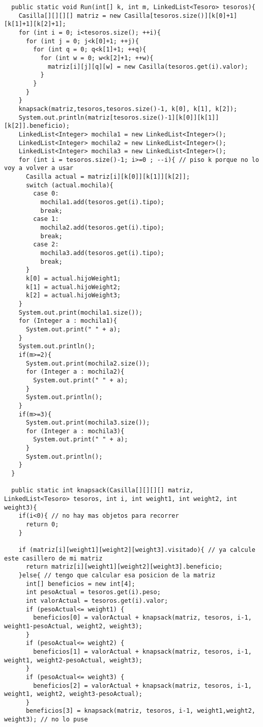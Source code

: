 \begin{lstlisting}
  public static void Run(int[] k, int m, LinkedList<Tesoro> tesoros){
    Casilla[][][][] matriz = new Casilla[tesoros.size()][k[0]+1][k[1]+1][k[2]+1];
    for (int i = 0; i<tesoros.size(); ++i){
      for (int j = 0; j<k[0]+1; ++j){
        for (int q = 0; q<k[1]+1; ++q){
          for (int w = 0; w<k[2]+1; ++w){
            matriz[i][j][q][w] = new Casilla(tesoros.get(i).valor);
          }
        }
      }
    }
    knapsack(matriz,tesoros,tesoros.size()-1, k[0], k[1], k[2]);
    System.out.println(matriz[tesoros.size()-1][k[0]][k[1]][k[2]].beneficio);
    LinkedList<Integer> mochila1 = new LinkedList<Integer>();
    LinkedList<Integer> mochila2 = new LinkedList<Integer>();
    LinkedList<Integer> mochila3 = new LinkedList<Integer>();
    for (int i = tesoros.size()-1; i>=0 ; --i){ // piso k porque no lo voy a volver a usar
      Casilla actual = matriz[i][k[0]][k[1]][k[2]];
      switch (actual.mochila){
        case 0:
          mochila1.add(tesoros.get(i).tipo);
          break;
        case 1:
          mochila2.add(tesoros.get(i).tipo);
          break;
        case 2:
          mochila3.add(tesoros.get(i).tipo);
          break;
      }
      k[0] = actual.hijoWeight1;
      k[1] = actual.hijoWeight2;
      k[2] = actual.hijoWeight3;
    }
    System.out.print(mochila1.size());
    for (Integer a : mochila1){
      System.out.print(" " + a);
    }
    System.out.println();
    if(m>=2){
      System.out.print(mochila2.size());
      for (Integer a : mochila2){
        System.out.print(" " + a);
      }
      System.out.println();
    }
    if(m>=3){
      System.out.print(mochila3.size());
      for (Integer a : mochila3){
        System.out.print(" " + a);
      }
      System.out.println();
    }
  }

  public static int knapsack(Casilla[][][][] matriz, LinkedList<Tesoro> tesoros, int i, int weight1, int weight2, int weight3){
    if(i<0){ // no hay mas objetos para recorrer
      return 0;
    }

    if (matriz[i][weight1][weight2][weight3].visitado){ // ya calcule este casillero de mi matriz
      return matriz[i][weight1][weight2][weight3].beneficio;
    }else{ // tengo que calcular esa posicion de la matriz
      int[] beneficios = new int[4];
      int pesoActual = tesoros.get(i).peso;
      int valorActual = tesoros.get(i).valor;
      if (pesoActual<= weight1) {
        beneficios[0] = valorActual + knapsack(matriz, tesoros, i-1, weight1-pesoActual, weight2, weight3);
      }
      if (pesoActual<= weight2) {
        beneficios[1] = valorActual + knapsack(matriz, tesoros, i-1, weight1, weight2-pesoActual, weight3);
      }
      if (pesoActual<= weight3) {
        beneficios[2] = valorActual + knapsack(matriz, tesoros, i-1, weight1, weight2, weight3-pesoActual);
      }
      beneficios[3] = knapsack(matriz, tesoros, i-1, weight1,weight2, weight3); // no lo puse


\end{lstlisting}
